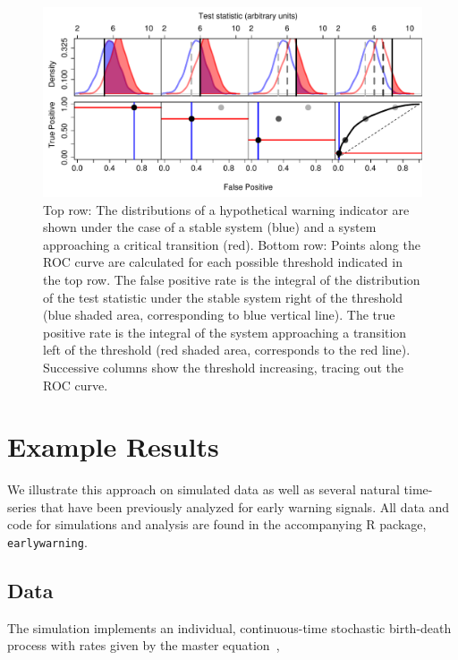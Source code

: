 \documentclass[authoryear,review,11pt]{elsarticle}
\begin{document}
\begin{figure}
   \begin{center}
     \includegraphics[width=\linewidth]{Fig1.pdf}
     \caption{Top row: The distributions of a hypothetical warning indicator are shown under the case of a stable system (blue) and a system approaching a critical transition (red).  Bottom row: Points along the ROC curve are calculated for each possible threshold indicated in the top row.  The false positive rate is the integral of the distribution of the test statistic under the stable system right of the threshold (blue shaded area, corresponding to blue vertical line).  The true positive rate is the integral of the system approaching a transition left of the threshold (red shaded area, corresponds to the red line).  Successive columns show the threshold increasing, tracing out the ROC curve.}
     \label{fig:roc_intro}
  \end{center}
 \end{figure}





\section{Example Results}
We illustrate this approach on simulated data as well as several natural time-series that have been previously analyzed for early warning signals.  All data and code for simulations and analysis are found in the accompanying R package, \verb|earlywarning|.


\subsection*{Data}
The simulation implements an individual, continuous-time stochastic birth-death process with rates given by the master equation~\citep{Gardiner2009},
\end{document}
